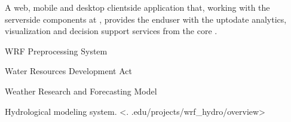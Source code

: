 \documentclass[letterpaper,12pt,english,openany,oneside]{sphinxmanual}
\begin{document}
\begin{description}
\sphinxAtStartPar
A web, mobile and desktop client\sphinxhyphen{}side application that, working with the server\sphinxhyphen{}side components at {\hyperref[\detokenize{glossary:term-RGVFlood.com}]{}}, provides the end\sphinxhyphen{}user with the up\sphinxhyphen{}to\sphinxhyphen{}date analytics, visualization and decision support services from the core {\hyperref[\detokenize{glossary:term-REON.cc}]{}} {\hyperref[\detokenize{glossary:term-CI}]{}}.

\sphinxAtStartPar
WRF Preprocessing System

\sphinxAtStartPar
Water Resources Development Act

\sphinxAtStartPar
Weather Research and Forecasting Model

\sphinxAtStartPar
{\hyperref[\detokenize{glossary:term-WRF}]{}} Hydrological modeling system.   \textless{}.
.edu/projects/wrf\_hydro/overview\textgreater{}

\end{description}
\end{document}

